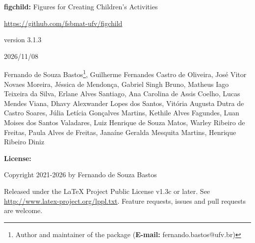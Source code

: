 \documentclass[x11names]{article}
\begin{document}
	
	
	
	\thispagestyle{empty}
	
	\begin{center}
		
		\textbf{figchild:} Figures for Creating Children's Activities
		
		\vspace{0.5cm}
		
		\url{https://github.com/fsbmat-ufv/figchild}
		
		\vspace{0.5cm}
		
		version 3.1.3
			\vspace{0.5cm}

			2026/11/08
	\end{center}
	
	\vspace{2cm}
	
	
	
	Fernando de Souza Bastos\footnote{Author and maintainer of the package (\textbf{E-mail:} fernando.bastos@ufv.br)}, 
	Guilherme Fernandes Castro de Oliveira, 
	José Vitor Novaes Moreira,
	Jéssica de Mendonça,
	Gabriel Singh Bruno,
	Matheus Iago Teixeira da Silva,
	Erlane Alves Santiago,
	Ana Carolina de Assis Coelho,
	Lucas Mendes Viana,
	Dhavy Alexwander Lopes dos Santos,
	Vitória Augusta Dutra de Castro Soares,
	Júlia Letícia Gonçalves Martins,
	Kethile Alves Fagundes,
	Luan Moises dos Santos Valadares,
	Luiz Henrique de Souza Matos,
	Warley Ribeiro de Freitas,
	Paula Alves de Freitas,
	Janaíne Geralda Mesquita Martins,
	Henrique Ribeiro Diniz
	
	\vspace{3cm}
	
	\noindent \textbf{License:}
	
	\vspace{1cm}
	
	\noindent Copyright 2021-2026 by Fernando de Souza Bastos
	
	\vspace{1cm}
	
	\noindent Released under the LaTeX Project Public License v1.3c or later. See \url{http://www.latex-project.org/lppl.txt}. Feature requests, issues and pull requests are welcome.
	
	\newpage
	
	\begin{abstract}
		This package was created to facilitate the work of Elementary School teachers who need to design colorful and engaging activities for their students. It is a product of the Computational Mathematics discipline at the Federal University of Viçosa – Campus UFV – Florestal, developed under the guidance of Professor Fernando de Souza Bastos. The package leverages the TikZ and xcolor packages to deliver high-quality, scalable, and customizable figures that can be seamlessly integrated into educational materials.
		
	\end{abstract}
	
\end{document}
